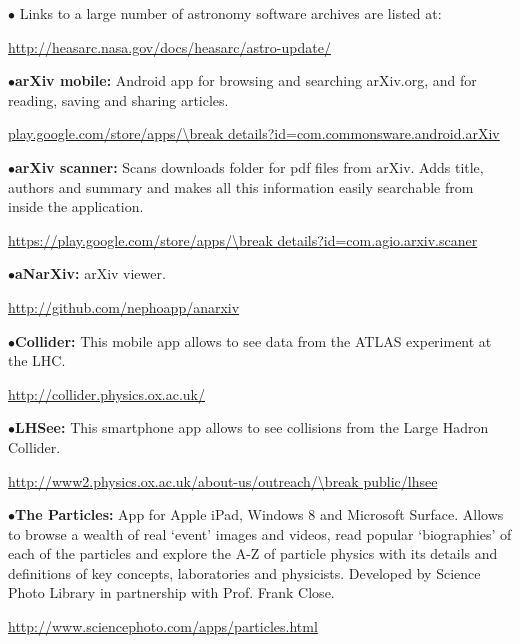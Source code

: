 \medskip

\item{$\bullet$}
Links to a large number of astronomy software archives are listed at:
	\item{}\qquad\url{http://heasarc.nasa.gov/docs/heasarc/astro-update/} 

\medskip


\item{$\bullet$}{\bf arXiv mobile:}
Android app for browsing and searching arXiv.org, and for reading, saving and sharing articles.
	\item{}\qquad\url{play.google.com/store/apps/\break details?id=com.commonsware.android.arXiv}

\medskip

\item{$\bullet$}{\bf arXiv scanner:}
Scans downloads folder for pdf files from arXiv. Adds title, authors and summary and makes all this information easily searchable from inside the application.
	\item{}\qquad\url{https://play.google.com/store/apps/\break details?id=com.agio.arxiv.scaner}

\medskip

\item{$\bullet$}{\bf aNarXiv:}
arXiv viewer.
        \item{}\qquad\url{http://github.com/nephoapp/anarxiv}

\medskip

\item{$\bullet$}{\bf Collider:}
This mobile app allows to see data from the ATLAS experiment at the LHC.
	\item{}\qquad\url{http://collider.physics.ox.ac.uk/}

\medskip

\item{$\bullet$}{\bf LHSee:}
This smartphone app allows to see collisions from the Large Hadron Collider.
	\item{}\qquad\url{http://www2.physics.ox.ac.uk/about-us/outreach/\break public/lhsee}

\medskip

\item{$\bullet$}{\bf The Particles:}
App for Apple iPad, Windows 8 and Microsoft Surface. Allows to browse a wealth of real ‘event’ images and videos, read popular ‘biographies’ of each of the particles and explore the A-Z of particle physics with its details and definitions of key concepts, laboratories and physicists. Developed by Science Photo Library in partnership with Prof. Frank Close.
	\item{}\qquad\url{http://www.sciencephoto.com/apps/particles.html}

